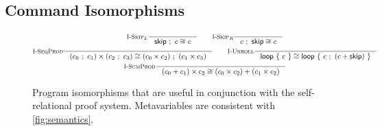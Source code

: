 \documentclass[p.tex]{subfiles}
\begin{document}
\subsection{Command Isomorphisms}

\begin{figure}
\begin{spreadlines}{5pt}
\begin{gather*}
  \inference[$\textsc{I-Skip}_L$]{%
  }{%
    \cseq{\cskip}{c} \cong c
  }
  \qquad
  \inference[$\textsc{I-Skip}_R$]{%
  }{%
    \cseq{c}{\cskip} \cong c
  }
  \\
  \inference[\textsc{I-SeqProd}]{%
  }{%
    \cprod{(\cseq{c_0}{c_1})}{(\cseq{c_2}{c_3})} \cong
    \cseq{(\cprod{c_0}{c_2})}{(\cprod{c_1}{c_3})}
  }
  \qquad
  \inference[\textsc{I-Unroll}]{%
  }{%
    \cloop{c} \cong \cloop{\cseq{c}{(\csum{c}{\cskip})}}
  }
  \\
  \inference[\textsc{I-SumProd}]{%
  }{%
    \cprod{(\csum{c_0}{c_1})}{c_2} \cong
    \csum{(\cprod{c_0}{c_2})}{(\cprod{c_1}{c_2})}
  }
\end{gather*}
\end{spreadlines}
\caption{%
  Program isomorphisms that are useful in conjunction with the
  self-relational proof system. Metavariables are consistent with
  \cref{fig:semantics}.
}
\end{figure}
\end{document}
